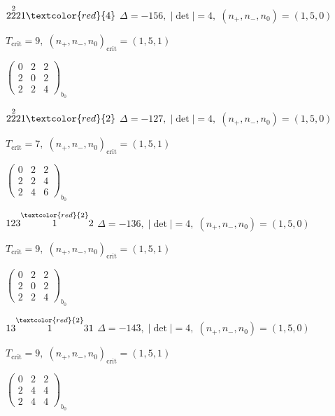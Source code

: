 \documentclass[10pt]{article}
\begin{document}
$2\overset{2}{2}21\textcolor{red}{4}$ \quad $\Delta=-156,\; |\det|=4,\; (n_+,n_-,n_0)=(1,5,0)$

\hspace{1em}$T_{\text{crit}}=9,\; (n_+,n_-,n_0)_{\text{crit}}=(1,5,1)$

\hspace{2em}$\left(\begin{smallmatrix}0 & 2 & 2 \\ 2 & 0 & 2 \\ 2 & 2 & 4\end{smallmatrix}\right)_{\!b_0}$

$2\overset{2}{2}21\textcolor{red}{2}$ \quad $\Delta=-127,\; |\det|=4,\; (n_+,n_-,n_0)=(1,5,0)$

\hspace{1em}$T_{\text{crit}}=7,\; (n_+,n_-,n_0)_{\text{crit}}=(1,5,1)$

\hspace{2em}$\left(\begin{smallmatrix}0 & 2 & 2 \\ 2 & 2 & 4 \\ 2 & 4 & 6\end{smallmatrix}\right)_{\!b_0}$

\smallskip

$123\overset{\textcolor{red}{2}}{1}2$ \quad $\Delta=-136,\; |\det|=4,\; (n_+,n_-,n_0)=(1,5,0)$

\hspace{1em}$T_{\text{crit}}=9,\; (n_+,n_-,n_0)_{\text{crit}}=(1,5,1)$

\hspace{2em}$\left(\begin{smallmatrix}0 & 2 & 2 \\ 2 & 0 & 2 \\ 2 & 2 & 4\end{smallmatrix}\right)_{\!b_0}$

\smallskip

$13\overset{\textcolor{red}{2}}{1}31$ \quad $\Delta=-143,\; |\det|=4,\; (n_+,n_-,n_0)=(1,5,0)$

\hspace{1em}$T_{\text{crit}}=9,\; (n_+,n_-,n_0)_{\text{crit}}=(1,5,1)$

\hspace{2em}$\left(\begin{smallmatrix}0 & 2 & 2 \\ 2 & 4 & 4 \\ 2 & 4 & 4\end{smallmatrix}\right)_{\!b_0}$
\end{document}
